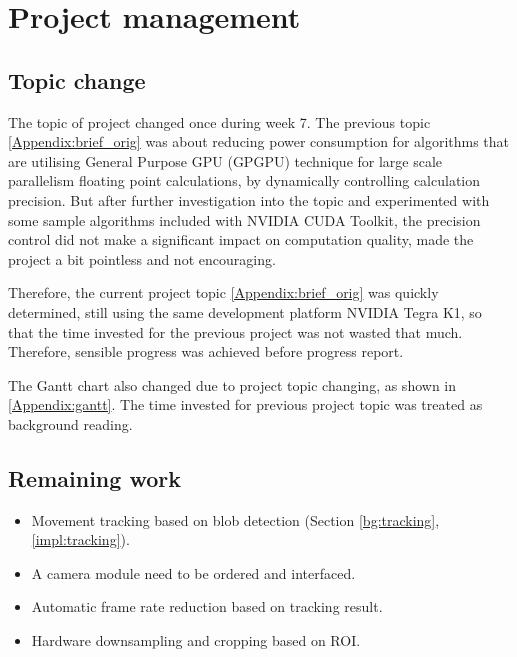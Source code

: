 \chapter{Project management}

\section{Topic change}

The topic of project changed once during week 7. The previous topic \ref{Appendix:brief_orig} was about reducing power consumption for algorithms that are utilising General Purpose GPU (GPGPU) technique for large scale parallelism floating point calculations, by dynamically controlling calculation precision. But after further investigation into the topic and experimented with some sample algorithms included with NVIDIA CUDA Toolkit, the precision control did not make a significant impact on computation quality, made the project a bit pointless and not encouraging.

Therefore, the current project topic \ref{Appendix:brief_orig} was quickly determined, still using the same development platform NVIDIA Tegra K1, so that the time invested for the previous project was not wasted that much. Therefore, sensible progress was achieved before progress report.

The Gantt chart also changed due to project topic changing, as shown in \ref{Appendix:gantt}. The time invested for previous project topic was treated as background reading.

\section{Remaining work}

\begin{itemize}
  \item Movement tracking based on blob detection (Section \ref{bg:tracking}, \ref{impl:tracking}).
  \item A camera module need to be ordered and interfaced.
  \item Automatic frame rate reduction based on tracking result.
  \item Hardware downsampling and cropping based on ROI.
\end{itemize}
